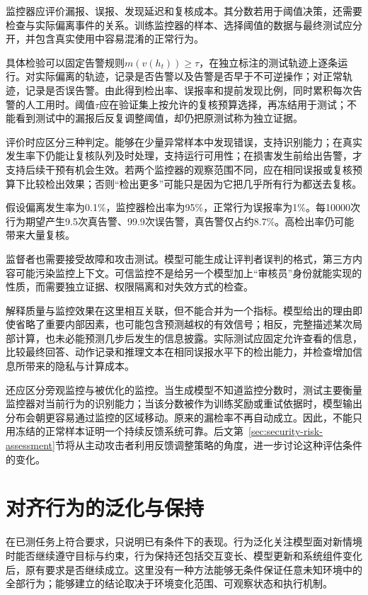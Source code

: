 监控器应评价漏报、误报、发现延迟和复核成本。其分数若用于阈值决策，还需要检查与实际偏离事件的关系。训练监控器的样本、选择阈值的数据与最终测试应分开，并包含真实使用中容易混淆的正常行为。

具体检验可以固定告警规则$m(v(h_t))\geq\tau$，在独立标注的测试轨迹上逐条运行。对实际偏离的轨迹，记录是否告警以及告警是否早于不可逆操作；对正常轨迹，记录是否误告警。由此得到检出率、误报率和提前发现比例，同时累积每次告警的人工用时。阈值$\tau$应在验证集上按允许的复核预算选择，再冻结用于测试；不能看到测试中的漏报后反复调整阈值，却仍把原测试称为独立证据。

评价时应区分三种判定。能够在少量异常样本中发现错误，支持识别能力；在真实发生率下仍能让复核队列及时处理，支持运行可用性；在损害发生前给出告警，才支持后续干预有机会生效。若两个监控器的观察范围不同，应在相同误报或复核预算下比较检出效果；否则“检出更多”可能只是因为它把几乎所有行为都送去复核。

\begin{example}[低发生率下的告警负担]
\label{ex:alignment-monitor-base-rate}
假设偏离发生率为0.1\%，监控器检出率为95\%，正常行为误报率为1\%。每10000次行为期望产生9.5次真告警、99.9次误告警，真告警仅占约8.7\%。高检出率仍可能带来大量复核。
\end{example}

监督者也需要接受故障和攻击测试。模型可能生成让评判者误判的格式，第三方内容可能污染监控上下文。可信监控不是给另一个模型加上“审核员”身份就能实现的性质，而需要独立证据、权限隔离和对失效方式的检查。

解释质量与监控效果在这里相互关联，但不能合并为一个指标。模型给出的理由即使省略了重要内部因素，也可能包含预测越权的有效信号；相反，完整描述某次局部计算，也未必能预测几步后发生的信息披露。实际测试应固定允许查看的信息，比较最终回答、动作记录和推理文本在相同误报水平下的检出能力，并检查增加信息所带来的隐私与计算成本。

还应区分旁观监控与被优化的监控。当生成模型不知道监控分数时，测试主要衡量监控器对当前行为的识别能力；当该分数被作为训练奖励或重试依据时，模型输出分布会朝更容易通过监控的区域移动。原来的漏检率不再自动成立。因此，不能只用冻结的正常样本证明一个持续反馈系统可靠。后文第~\ref{sec:security-risk-assessment}节将从主动攻击者利用反馈调整策略的角度，进一步讨论这种评估条件的变化。

\section{对齐行为的泛化与保持}
\label{sec:alignment-generalization}

在已测任务上符合要求，只说明已有条件下的表现。行为泛化关注模型面对新情境时能否继续遵守目标与约束，行为保持还包括交互变长、模型更新和系统组件变化后，原有要求是否继续成立。这里没有一种方法能够无条件保证任意未知环境中的全部行为；能够建立的结论取决于环境变化范围、可观察状态和执行机制。

